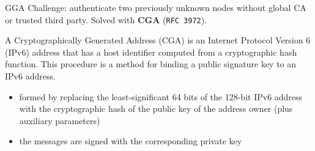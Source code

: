 \documentclass[10pt]{beamer}
\begin{document}
\begin{frame}{GGA}
	Challenge: authenticate two previously unknown nodes without global CA or trusted third party. Solved with \alert{\textbf{CGA}} (\texttt{RFC 3972}).
	\par
	A Cryptographically Generated Address (CGA) is an Internet Protocol Version 6 (IPv6) address that has a host identifier computed from a cryptographic hash function. This procedure is a method for binding a public signature key to an IPv6 address.
	\begin{itemize}
		\item formed by replacing the least-significant 64 bits of the 128-bit IPv6 address with the \alert{cryptographic hash} of the public key of the address owner (plus auxiliary parameters)
		\item the messages are signed with the corresponding private key
	\end{itemize}
\end{frame}


\end{document}
